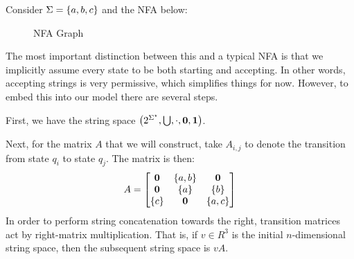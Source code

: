 \begin{example}
  Consider \(\Sigma = \left\{a, b, c\right\}\) and the NFA below:

  \begin{figure}[h!]
  \centering
  \caption{NFA Graph}
  \end{figure}
  The most important distinction between this and a typical
  NFA is that we implicitly assume every state to be both starting
  and accepting.
  In other words, accepting strings is very permissive,
  which simplifies things for now.
  However,
  to embed this into our model there are several steps.

  First, we have the string space
  \(\left(2^{\Sigma^\star}, \bigcup, \cdot, \mathbf{0}, \mathbf{1}\right)\).

  Next, for the matrix \(A\) that we will construct,
  take \(A_{i, j}\) to denote the transition from state
  \(q_i\) to state \(q_j\).
  The matrix is then:
  \begin{align*}
    A =
      \begin{bmatrix}
        \mathbf{0} & \left\{a, b\right\} & \mathbf{0} \\
        \mathbf{0} & \left\{a\right\} & \left\{b\right\} \\
        \left\{c\right\} & \mathbf{0} & \left\{a, c\right\}
      \end{bmatrix}
  \end{align*}
  In order to perform string concatenation towards the right,
  transition matrices act by right-matrix multiplication.
  That is, if \(v \in R^3\) is the initial \(n\)-dimensional
  string space, then the subsequent string space is \(v A\).


\end{example}
